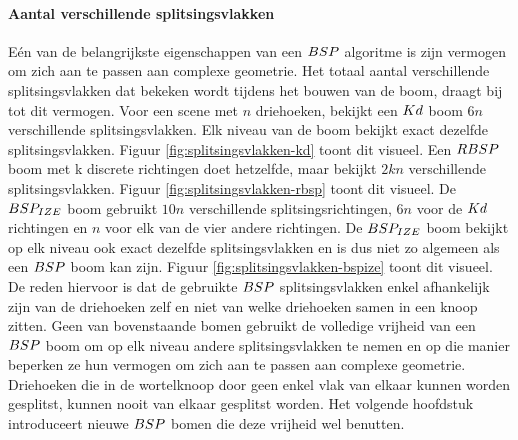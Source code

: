   \paragraph{Aantal verschillende splitsingsvlakken}
  Eén van de belangrijkste eigenschappen van een $BSP$ algoritme is zijn vermogen om zich aan te passen aan complexe geometrie.
  Het totaal aantal verschillende splitsingsvlakken dat bekeken wordt tijdens het bouwen van de boom, draagt bij tot dit vermogen.
  Voor een scene met $n$ driehoeken, bekijkt een $Kd$ boom $6n$ verschillende splitsingsvlakken. 
  Elk niveau van de boom bekijkt exact dezelfde splitsingsvlakken. Figuur \ref{fig:splitsingsvlakken-kd} toont dit visueel.
  Een $RBSP$ boom met k discrete richtingen doet hetzelfde, maar bekijkt $2kn$ verschillende splitsingsvlakken. 
  Figuur \ref{fig:splitsingsvlakken-rbsp} toont dit visueel.
  De $BSP_{IZE}$ boom gebruikt $10n$ verschillende splitsingsrichtingen, $6n$ voor de $Kd$ richtingen en $n$ voor elk van de vier andere richtingen.
  De $BSP_{IZE}$ boom bekijkt op elk niveau ook exact dezelfde splitsingsvlakken en is dus niet zo algemeen als een $BSP$ boom kan zijn. 
  Figuur \ref{fig:splitsingsvlakken-bspize} toont dit visueel.
  De reden hiervoor is dat de gebruikte $BSP$ splitsingsvlakken enkel afhankelijk zijn van de driehoeken zelf en niet van welke driehoeken samen in een knoop zitten.
  Geen van bovenstaande bomen gebruikt de volledige vrijheid van een $BSP$ boom om op elk niveau andere splitsingsvlakken te nemen en op die manier beperken ze hun vermogen om zich aan te passen aan complexe geometrie.
  Driehoeken die in de wortelknoop door geen enkel vlak van elkaar kunnen worden gesplitst, kunnen nooit van elkaar gesplitst worden.
  Het volgende hoofdstuk introduceert nieuwe $BSP$ bomen die deze vrijheid wel benutten.

